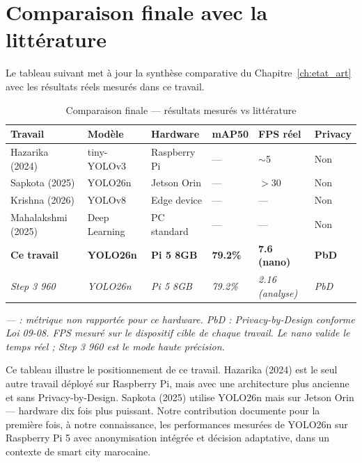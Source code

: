 \section{Comparaison finale avec
         la littérature}

Le tableau suivant met à jour la synthèse
comparative du Chapitre~\ref{ch:etat_art}
avec les résultats réels mesurés dans
ce travail.

\begin{table}[H]
\centering
\caption{Comparaison finale —
         résultats mesurés vs littérature}
\scriptsize
\begin{tabularx}{\textwidth}{lXXXXX}
\toprule
\textbf{Travail} &
\textbf{Modèle} &
\textbf{Hardware} &
\textbf{mAP50} &
\textbf{FPS réel} &
\textbf{Privacy} \\
\midrule
Hazarika (2024) &
tiny-YOLOv3 &
Raspberry Pi &
— &
$\sim$5 &
Non \\
Sapkota (2025) &
YOLO26n &
Jetson Orin &
— &
$>$30 &
Non \\
Krishna (2026) &
YOLOv8 &
Edge device &
— &
— &
Non \\
Mahalakshmi (2025) &
Deep Learning &
PC standard &
— &
— &
Non \\
\midrule
\rowcolor{PrimaryBlue!10}
\textbf{Ce travail} &
\textbf{YOLO26n} &
\textbf{Pi 5 8GB} &
\textbf{79.2\%} &
\textbf{7.6 (nano)} &
\textbf{PbD} \\
\rowcolor{PrimaryBlue!5}
\textit{Step 3 960} &
\textit{YOLO26n} &
\textit{Pi 5 8GB} &
\textit{79.2\%} &
\textit{2.16 (analyse)} &
\textit{PbD} \\
\bottomrule
\end{tabularx}
\vspace{0.3em}
\begin{flushleft}
\scriptsize\textit{— : métrique non
rapportée pour ce hardware.
PbD : Privacy-by-Design conforme
Loi 09-08. FPS mesuré sur le
dispositif cible de chaque travail.
Le nano valide le temps réel ;
Step 3 960 est le mode haute précision.}
\end{flushleft}
\label{tab:comparaison_finale}
\end{table}

Ce tableau illustre le positionnement
de ce travail. Hazarika (2024) est le
seul autre travail déployé sur Raspberry
Pi, mais avec une architecture plus
ancienne et sans Privacy-by-Design.
Sapkota (2025) utilise YOLO26n mais
sur Jetson Orin — hardware dix fois
plus puissant. Notre contribution
documente pour la première fois, à
notre connaissance, les performances
mesurées de YOLO26n sur Raspberry Pi 5
avec anonymisation intégrée et décision
adaptative, dans un contexte de smart
city marocaine.


